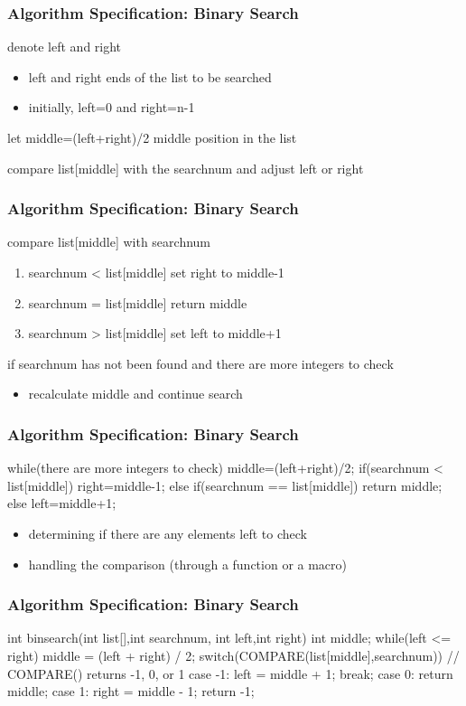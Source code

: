 \documentclass[newPxFont,sthlmFooter,nooffset]{beamer}
\begin{document}
\begin{frame}[t]
  \frametitle{Algorithm Specification: Binary Search}
denote left and right
\begin{itemize}
\item left and right ends of the list to be searched
\item initially, left=0 and right=n-1
\end{itemize}

let middle=(left+right)/2 middle position in the list

compare list[middle] with the searchnum and adjust left or right

\end{frame}
\begin{frame}[t]
  \frametitle{Algorithm Specification: Binary Search}
compare list[middle] with searchnum
\begin{enumerate}
\item searchnum < list[middle] set right to middle-1
\item searchnum = list[middle] return middle 
\item searchnum > list[middle] set left to middle+1
\end{enumerate}

if searchnum has not been found
and there are more integers to check
\begin{itemize}
\item recalculate middle and continue search
\end{itemize}

\end{frame}
\begin{frame}[t, fragile]
  \frametitle{Algorithm Specification: Binary Search}
\begin{codedef}
while(there are more integers to check) { 
   middle=(left+right)/2;
   if(searchnum < list[middle])
      right=middle-1;
   else if(searchnum == list[middle])
       return middle;
   else left=middle+1;
}  
\end{codedef}
\begin{itemize}
\item determining if there are any elements left to check
\item handling the comparison (through a function or a macro)
\end{itemize}
\end{frame}
\begin{frame}[t, fragile]
  \frametitle{Algorithm Specification: Binary Search}
\begin{codedef}
int binsearch(int list[],int searchnum,
                        int left,int right) {
   int middle;
   while(left <= right) {
      middle = (left + right) / 2; 
      switch(COMPARE(list[middle],searchnum)) { 
         // COMPARE() returns -1, 0, or 1
         case -1: left = middle + 1;
                  break;
         case  0: return middle;
         case  1: right = middle - 1;
      }
   }
   return -1; 
}
\end{codedef}
\end{frame}
\end{document}
